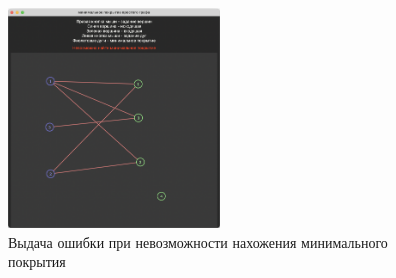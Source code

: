 \documentclass[12pt]{article}
\begin{document}
\begin{figure}[h]
    \centering
    \includegraphics[width=0.5\textwidth]{screenshot1.png}
    \caption{Выдача ошибки при невозможности
        нахожения минимального покрытия}
    \label{fig:failure_example}
\end{figure}
\end{document}
